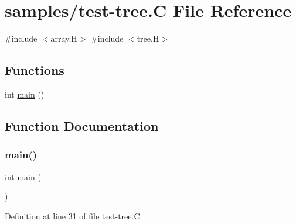 \hypertarget{test-tree_8_c}{}\section{samples/test-\/tree.C File Reference}
\label{test-tree_8_c}
{\ttfamily \#include $<$array.\+H$>$}\newline
{\ttfamily \#include $<$tree.\+H$>$}\newline
\subsection*{Functions}
\begin{DoxyCompactItemize}
\item 
int \hyperlink{test-tree_8_c_ae66f6b31b5ad750f1fe042a706a4e3d4}{main} ()
\end{DoxyCompactItemize}


\subsection{Function Documentation}
\mbox{\label{test-tree_8_c_ae66f6b31b5ad750f1fe042a706a4e3d4}} 
\subsubsection{\texorpdfstring{main()}{main()}}
{\footnotesize\ttfamily int main (\begin{DoxyParamCaption}{ }\end{DoxyParamCaption})}



Definition at line 31 of file test-\/tree.\+C.

